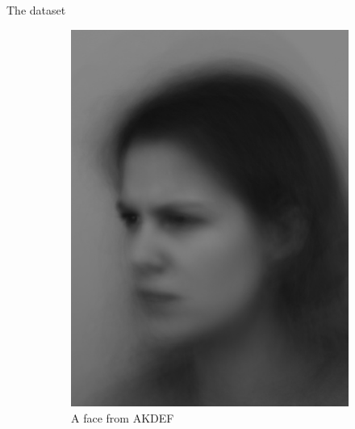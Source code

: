 \documentclass[10pt]{beamer}
\begin{document}
\begin{frame}[fragile]{The dataset}
\begin{figure}[h!]
\begin{subfigure}[c]{0.45\textwidth}
            \includegraphics[width=1\textwidth]{exercise_3/paper/images/FANHL.JPG}
            \caption{A face from AKDEF}
            \label{fig:AKDEF_face}
        \end{subfigure}
        \caption{}
        \label{fig:faces}
    \end{figure}
\end{frame}
\end{document}
